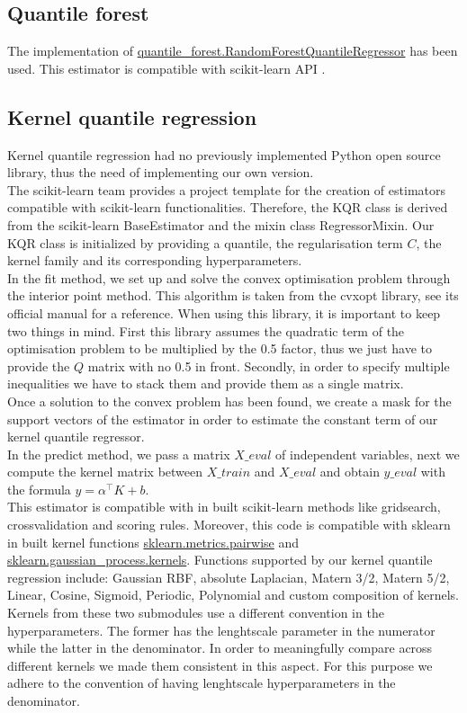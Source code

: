 \subsection{Quantile forest}
The implementation of \href{https://pypi.org/project/quantile-forest/}{quantile\_forest.RandomForestQuantileRegressor} has been used. This estimator is compatible with scikit-learn API \cite{Johnson2024}.
\subsection{Kernel quantile regression}
Kernel quantile regression had no previously implemented Python open source library, thus the need of implementing our own version.
\\
The scikit-learn team provides a project template for the creation of estimators compatible with scikit-learn functionalities. Therefore, the KQR class is derived from the scikit-learn BaseEstimator and the mixin class RegressorMixin.
Our KQR class is initialized by providing a quantile, the regularisation term $C$, the kernel family and its corresponding hyperparameters.
\\
In the fit method, we set up and solve the convex optimisation problem through the interior point method. This algorithm is taken from the cvxopt library, see its official manual  for a reference.
When using this library, it is important to keep two things in mind. First this library assumes the quadratic term of the optimisation problem to be multiplied by the 0.5 factor, thus we just have to provide the $Q$ matrix with no 0.5 in front.
Secondly, in order to specify multiple inequalities we have to stack them and provide them as a single matrix.
\\
Once a solution to the convex problem has been found, we create a mask for the support vectors of the estimator in order to estimate the constant term of our kernel quantile regressor.
\\
In the predict method, we pass a matrix $X\_eval$ of independent variables, next we compute the kernel matrix between $X\_train$ and $X\_eval$ and obtain $y\_eval$ with the formula $y=\alpha^\intercal K+b$.
\\
This estimator is compatible with in built scikit-learn methods like gridsearch, crossvalidation and scoring rules. Moreover, this code is compatible with sklearn in built kernel functions \href{https://scikit-learn.org/stable/modules/classes.html#module-sklearn.metrics.pairwise}{sklearn.metrics.pairwise} and \href{https://scikit-learn.org/stable/modules/classes.html#module-sklearn.gaussian_process.kernels}{sklearn.gaussian\_process.kernels}. Functions supported by our kernel quantile regression include: Gaussian RBF, absolute Laplacian, Matern 3/2, Matern 5/2, Linear, Cosine, Sigmoid, Periodic, Polynomial and custom composition of kernels. 
Kernels from these two submodules use a different convention in the hyperparameters. The former has the lenghtscale parameter in the numerator while the latter in the denominator. In order to meaningfully compare across different kernels we made them consistent in this aspect. For this purpose we adhere to the convention of having lenghtscale hyperparameters in the denominator.


